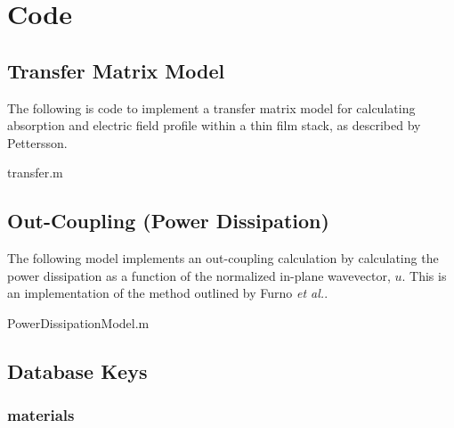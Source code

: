 \documentclass[../thesis.tex]{subfiles}
\begin{document}
\chapter{Code}\label{sec:code}
\section{Transfer Matrix Model}
The following is code to implement a transfer matrix model for calculating absorption and electric field profile within a thin film stack, as described by Pettersson.\supercite{Pettersson1999}

transfer.m


\section{Out-Coupling (Power Dissipation)}\label{sec:outCoupling_code}
The following model implements an out-coupling calculation by calculating the power dissipation as a function of the normalized in-plane wavevector, $u$.  
This is an implementation of the method outlined by Furno \textit{et al.}.\supercite{Furno2010,Furno2012}

PowerDissipationModel.m



\newpage
\section{Database Keys}
\subsection{materials}
\end{document}
